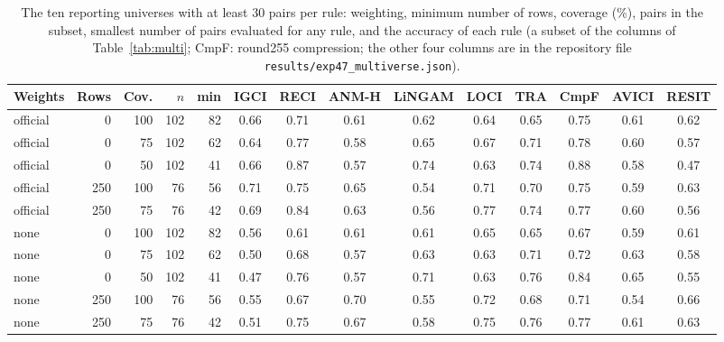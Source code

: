 \begin{table}[ht]
\caption{The ten reporting universes with at least $30$ pairs per rule: weighting, minimum number of rows, coverage (\%), pairs in the subset, smallest number of pairs evaluated for any rule, and the accuracy of each rule (a subset of the columns of Table~\ref{tab:multi}; CmpF: round255 compression; the other four columns are in the repository file \texttt{results/exp47\_multiverse.json}).}
\label{tab:universes}
\tiny\setlength{\tabcolsep}{1.5pt}
\begin{tabular}{@{}lrrrrccccccccc@{}}
\toprule
Weights & Rows & Cov. & $n$ & min & IGCI & RECI & ANM-H & LiNGAM & LOCI & TRA & CmpF & AVICI & RESIT\\
\midrule
official & 0 & 100 & 102 & 82 & 0.66 & 0.71 & 0.61 & 0.62 & 0.64 & 0.65 & 0.75 & 0.61 & 0.62\\
official & 0 & 75 & 102 & 62 & 0.64 & 0.77 & 0.58 & 0.65 & 0.67 & 0.71 & 0.78 & 0.60 & 0.57\\
official & 0 & 50 & 102 & 41 & 0.66 & 0.87 & 0.57 & 0.74 & 0.63 & 0.74 & 0.88 & 0.58 & 0.47\\
official & 250 & 100 & 76 & 56 & 0.71 & 0.75 & 0.65 & 0.54 & 0.71 & 0.70 & 0.75 & 0.59 & 0.63\\
official & 250 & 75 & 76 & 42 & 0.69 & 0.84 & 0.63 & 0.56 & 0.77 & 0.74 & 0.77 & 0.60 & 0.56\\
none & 0 & 100 & 102 & 82 & 0.56 & 0.61 & 0.61 & 0.61 & 0.65 & 0.65 & 0.67 & 0.59 & 0.61\\
none & 0 & 75 & 102 & 62 & 0.50 & 0.68 & 0.57 & 0.63 & 0.63 & 0.71 & 0.72 & 0.63 & 0.58\\
none & 0 & 50 & 102 & 41 & 0.47 & 0.76 & 0.57 & 0.71 & 0.63 & 0.76 & 0.84 & 0.65 & 0.55\\
none & 250 & 100 & 76 & 56 & 0.55 & 0.67 & 0.70 & 0.55 & 0.72 & 0.68 & 0.71 & 0.54 & 0.66\\
none & 250 & 75 & 76 & 42 & 0.51 & 0.75 & 0.67 & 0.58 & 0.75 & 0.76 & 0.77 & 0.61 & 0.63\\
\bottomrule
\end{tabular}
\end{table}

